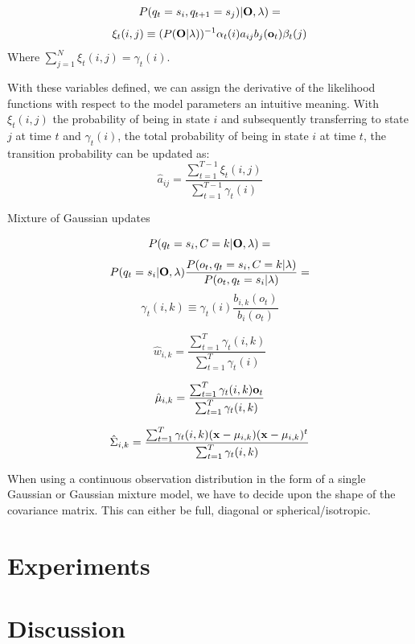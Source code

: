 \documentclass[conference]{IEEEtran}
\begin{document}
\[
 P(q_{t} = s_{i},q_{t+1} = s_{j}) | {\bf O}, \lambda) =
\]
\[
 \xi_{t}(i,j) \equiv (P({\bf O}|\lambda))^{-1} \alpha_{t}(i)a_{ij}b_{j}({\bf o}_{t})\beta_{t}(j)
\]
Where $\sum_{j=1}^{N} \xi_{t}(i,j) = \gamma_{t}(i)$.

With these variables defined, we can assign the derivative of the likelihood functions with respect to the model parameters an intuitive meaning. With $\xi_{t}(i,j)$ the probability of being in state $i$ and subsequently transferring to state $j$ at time $t$ and $\gamma_{t}(i)$, the total probability of being in state $i$ at time $t$, the transition probability can be updated as:
\begin{equation}
 \hat{a}_{ij} = \frac{\displaystyle \sum_{t=1}^{T-1} \xi_{t}(i,j) } {\displaystyle \sum_{t=1}^{T-1} \gamma_{t}(i) }
\end{equation}




Mixture of Gaussian updates

\[
  P(q_{t} = s_{i}, C = k | {\bf O}, \lambda) = 
\]
\[
 P(q_{t} = s_{i}| {\bf O}, \lambda ) \frac{P(o_{t},q_{t}=s_{i},C=k|\lambda )}{ P(o_{t}, q_{t} = s_{i}| \lambda) } = 
\]
\begin{equation}
 \gamma_{t}(i,k) \equiv \gamma_{t}(i) \frac{ b_{i,k}(o_{t}) } { b_{i}(o_{t}) }
\end{equation}


\begin{equation}
 \label{updateWeightGMM}
 \hat{w}_{i,k} = \displaystyle \frac{\sum_{t=1}^{T} \gamma_{t}(i,k) }{ \sum_{t=1}^{T} \gamma_{t}(i) }
\end{equation}

\begin{equation}
 \label{updateMeanGMM}
 \hat{\bf{\mu}}_{i,k} = \displaystyle \frac{ \sum_{t=1}^{T} \gamma_{t}(i,k) {\bf o}_{t} }{ \sum_{t=1}^{T} \gamma_{t}(i,k) }
\end{equation}

\begin{equation}
 \label{updateCovarianceGMM}
 \hat{\Sigma}_{i,k} = \displaystyle \frac{ \sum_{t=1}^{T} \gamma_{t}(i,k) ({\bf x} - {\bf \mu}_{i,k})( {\bf x} - {\bf \mu}_{i,k} )^{t} }{ \sum_{t=1}^{T} \gamma_{t}(i,k) }
\end{equation}

When using a continuous observation distribution in the form of a single Gaussian or Gaussian mixture model, we have to decide upon the shape of the covariance matrix. This can either be full, diagonal or spherical/isotropic. 

\section{Experiments}
\section{Discussion}
\end{document}
